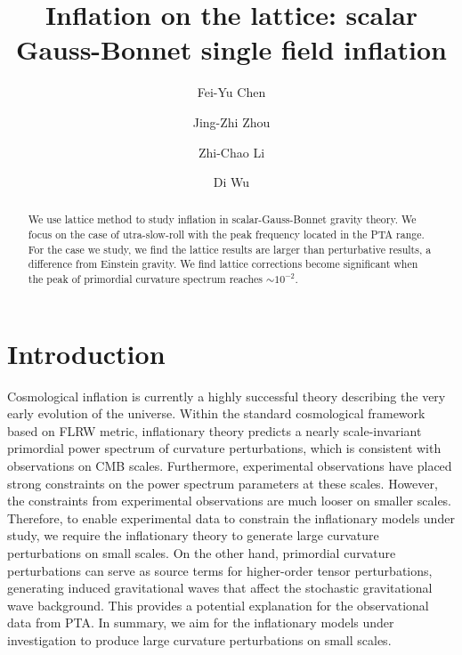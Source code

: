 \documentclass[reprint, 10pt, amsmath, amssymb, floatfix, aps, prd, superscriptaddress, nofootinbib, nobibnotes,twocolumn]{revtex4-1}
\begin{document}
\author{Fei-Yu Chen}

\author{Jing-Zhi Zhou}

\author{Zhi-Chao Li}

\author{Di Wu}

\begin{abstract}
	We use lattice method to study inflation in scalar-Gauss-Bonnet gravity theory. We focus on the case of utra-slow-roll with the peak frequency located in the PTA range. For the case we study, we find the lattice results are larger than perturbative results, a difference from Einstein gravity. We find lattice corrections become significant when the peak of primordial curvature spectrum reaches $\sim 10^{-2}$.
\end{abstract}
\title{Inflation on the lattice: scalar Gauss-Bonnet single field inflation}

\maketitle

\section{Introduction}
\label{sec:intro}
Cosmological inflation is currently a highly successful theory describing the very early evolution of the universe. Within the standard cosmological framework based on FLRW metric, inflationary theory predicts a nearly scale-invariant primordial power spectrum of curvature perturbations, which is consistent with observations on CMB scales. Furthermore, experimental observations have placed strong constraints on the power spectrum parameters at these scales. However, the constraints from experimental observations are much looser on smaller scales. Therefore, to enable experimental data to constrain the inflationary models under study, we require the inflationary theory to generate large curvature perturbations on small scales. On the other hand, primordial curvature perturbations can serve as source terms for higher-order tensor perturbations, generating induced gravitational waves that affect the stochastic gravitational wave background. This provides a potential explanation for the observational data from PTA. In summary, we aim for the inflationary models under investigation to produce large curvature perturbations on small scales.
\end{document}
